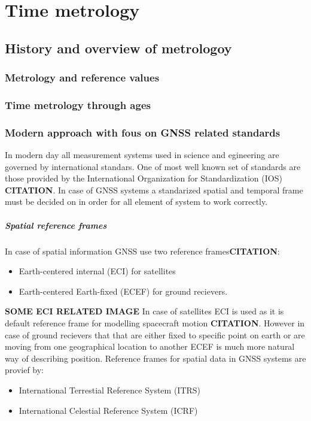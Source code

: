 \chapter{Time metrology}


\section{History and overview of metrologoy}

\subsection{Metrology and reference values}

\subsection{Time metrology through ages}

\subsection{Modern approach with fous on GNSS related standards}
In modern day all measurement systems used in science and egineering are governed by international
standars. One of most well known set of standards are those provided by the International 
Organization for Standardization (IOS) \textbf{CITATION}.
In case of GNSS systems a standarized spatial and temporal frame must be decided on in order
for all element of system to work correctly.

\paragraph{Spatial reference frames}
In case of spatial information GNSS use two reference frames\textbf{CITATION}:
\begin{itemize}
	\item Earth-centered internal (ECI) for satellites
	\item Earth-centered Earth-fixed (ECEF) for ground recievers.
\end{itemize}
\textbf{SOME ECI RELATED IMAGE}
In case of satellites ECI is used as it is default reference frame for modelling spacecraft
motion \textbf{CITATION}. However in case of ground recievers that that are either fixed to 
specific point on earth or are moving from one geographical location to another ECEF is much
more natural way of describing position.
Reference frames for spatial data in GNSS systems are provief by:
\begin{itemize}
	\item International Terrestial Reference System (ITRS)
	\item International Celestial Reference System (ICRF)
\end{itemize}

